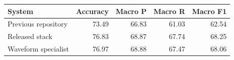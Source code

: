 \begin{tabular}{lrrrr}
\toprule
System & Accuracy & Macro P & Macro R & Macro F1 \\
\midrule
Previous repository & 73.49 & 66.83 & 61.03 & 62.54 \\
Released stack & 76.83 & 68.87 & 67.74 & 68.25 \\
Waveform specialist & 76.97 & 68.88 & 67.47 & 68.06 \\
\bottomrule
\end{tabular}
